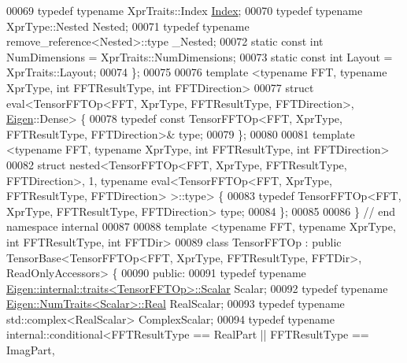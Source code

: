 \begin{DoxyCode}
00069   \textcolor{keyword}{typedef} \textcolor{keyword}{typename} XprTraits::Index \hyperlink{namespace_eigen_a62e77e0933482dafde8fe197d9a2cfde}{Index};
00070   \textcolor{keyword}{typedef} \textcolor{keyword}{typename} XprType::Nested Nested;
00071   \textcolor{keyword}{typedef} \textcolor{keyword}{typename} remove\_reference<Nested>::type \_Nested;
00072   \textcolor{keyword}{static} \textcolor{keyword}{const} \textcolor{keywordtype}{int} NumDimensions = XprTraits::NumDimensions;
00073   \textcolor{keyword}{static} \textcolor{keyword}{const} \textcolor{keywordtype}{int} Layout = XprTraits::Layout;
00074 \};
00075 
00076 \textcolor{keyword}{template} <\textcolor{keyword}{typename} FFT, \textcolor{keyword}{typename} XprType, \textcolor{keywordtype}{int} FFTResultType, \textcolor{keywordtype}{int} FFTDirection>
00077 \textcolor{keyword}{struct }eval<TensorFFTOp<FFT, XprType, FFTResultType, FFTDirection>, \hyperlink{namespace_eigen}{Eigen}::Dense> \{
00078   \textcolor{keyword}{typedef} \textcolor{keyword}{const} TensorFFTOp<FFT, XprType, FFTResultType, FFTDirection>& type;
00079 \};
00080 
00081 \textcolor{keyword}{template} <\textcolor{keyword}{typename} FFT, \textcolor{keyword}{typename} XprType, \textcolor{keywordtype}{int} FFTResultType, \textcolor{keywordtype}{int} FFTDirection>
00082 \textcolor{keyword}{struct }nested<TensorFFTOp<FFT, XprType, FFTResultType, FFTDirection>, 1, typename eval<TensorFFTOp<FFT, 
      XprType, FFTResultType, FFTDirection> >::type> \{
00083   \textcolor{keyword}{typedef} TensorFFTOp<FFT, XprType, FFTResultType, FFTDirection> type;
00084 \};
00085 
00086 \}  \textcolor{comment}{// end namespace internal}
00087 
00088 \textcolor{keyword}{template} <\textcolor{keyword}{typename} FFT, \textcolor{keyword}{typename} XprType, \textcolor{keywordtype}{int} FFTResultType, \textcolor{keywordtype}{int} FFTDir>
00089 \textcolor{keyword}{class }TensorFFTOp : \textcolor{keyword}{public} TensorBase<TensorFFTOp<FFT, XprType, FFTResultType, FFTDir>, ReadOnlyAccessors>
       \{
00090  \textcolor{keyword}{public}:
00091   \textcolor{keyword}{typedef} \textcolor{keyword}{typename} \hyperlink{struct_eigen_1_1internal_1_1traits}{Eigen::internal::traits<TensorFFTOp>::Scalar}
       Scalar;
00092   \textcolor{keyword}{typedef} \textcolor{keyword}{typename} \hyperlink{group___sparse_core___module}{Eigen::NumTraits<Scalar>::Real} RealScalar;
00093   \textcolor{keyword}{typedef} \textcolor{keyword}{typename} std::complex<RealScalar> ComplexScalar;
00094   \textcolor{keyword}{typedef} \textcolor{keyword}{typename} internal::conditional<FFTResultType == RealPart || FFTResultType == ImagPart,

\end{DoxyCode}
